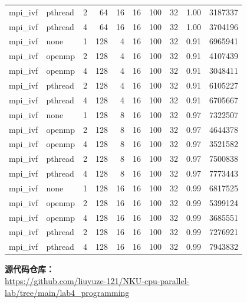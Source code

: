 \documentclass[a4paper]{article}
\begin{document}
{\begin{longtable}{lllrrrrrrr}
mpi\_ivf & pthread & 2 & 64 & 16 & 16 & 100 & 32 & 1.00 & 3187337 \\
mpi\_ivf & pthread & 4 & 64 & 16 & 16 & 100 & 32 & 1.00 & 3704196 \\
mpi\_ivf & none & 1 & 128 & 4 & 16 & 100 & 32 & 0.91 & 6965941 \\
mpi\_ivf & openmp & 2 & 128 & 4 & 16 & 100 & 32 & 0.91 & 4107439 \\
mpi\_ivf & openmp & 4 & 128 & 4 & 16 & 100 & 32 & 0.91 & 3048411 \\
mpi\_ivf & pthread & 2 & 128 & 4 & 16 & 100 & 32 & 0.91 & 6105227 \\
mpi\_ivf & pthread & 4 & 128 & 4 & 16 & 100 & 32 & 0.91 & 6705667 \\
mpi\_ivf & none & 1 & 128 & 8 & 16 & 100 & 32 & 0.97 & 7322507 \\
mpi\_ivf & openmp & 2 & 128 & 8 & 16 & 100 & 32 & 0.97 & 4644378 \\
mpi\_ivf & openmp & 4 & 128 & 8 & 16 & 100 & 32 & 0.97 & 3521582 \\
mpi\_ivf & pthread & 2 & 128 & 8 & 16 & 100 & 32 & 0.97 & 7500838 \\
mpi\_ivf & pthread & 4 & 128 & 8 & 16 & 100 & 32 & 0.97 & 7773443 \\
mpi\_ivf & none & 1 & 128 & 16 & 16 & 100 & 32 & 0.99 & 6817525 \\
mpi\_ivf & openmp & 2 & 128 & 16 & 16 & 100 & 32 & 0.99 & 5399124 \\
mpi\_ivf & openmp & 4 & 128 & 16 & 16 & 100 & 32 & 0.99 & 3685551 \\
mpi\_ivf & pthread & 2 & 128 & 16 & 16 & 100 & 32 & 0.99 & 7276921 \\
mpi\_ivf & pthread & 4 & 128 & 16 & 16 & 100 & 32 & 0.99 & 7943832 \\
\bottomrule
\end{longtable}
}


\newpage



\vspace{1cm}
\noindent\textbf{\large 源代码仓库：}\\
\url{https://github.com/liuyuze-121/NKU-cpu-parallel-lab/tree/main/lab4_programming}
\end{document}
